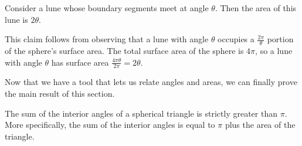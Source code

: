 \begin{claim}
	Consider a lune whose boundary segments meet at angle $\theta$.  Then the area of this lune is $2\theta$.
\end{claim}

This claim follows from observing that a lune with angle $\theta$ occupies a $\tfrac{2\pi}{\theta}$ portion of the sphere's surface area.  The total surface area of the sphere is $4\pi$, so a lune with angle $\theta$ has surface area $\tfrac{4\pi\theta}{2\pi}= 2\theta$.


Now that we have a tool that lets us relate angles and areas, we can finally prove the main result of this section.






	



\begin{lemma}\label{lem:sphtri}
	
The sum of the interior angles of a spherical triangle is strictly greater than $\pi$.  More specifically, the sum of the interior angles is equal to $\pi$ plus the area of the triangle.
\end{lemma}

